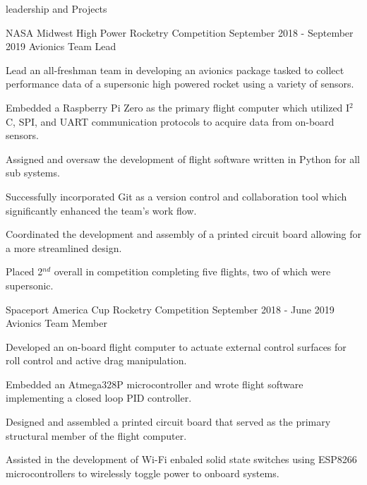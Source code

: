 \documentclass{resume} %
\begin{document}
\begin{rSection} {leadership and Projects}
\begin{rSubsection} {NASA Midwest High Power Rocketry Competition} {September 2018 - September 2019} {Avionics Team Lead}
            \item Lead an all-freshman team in developing an avionics package tasked to collect performance data of a supersonic high powered rocket using a variety of sensors.
            \item Embedded a Raspberry Pi Zero as the primary flight computer which utilized I$^2$C, SPI, and UART communication protocols to acquire data from on-board sensors.
            \item Assigned and oversaw the development of flight software written in Python for all sub systems.
            \item Successfully incorporated Git as a version control and collaboration tool which significantly enhanced the team's work flow.
            \item Coordinated the development and assembly of a printed circuit board allowing for a more streamlined design.
            \item Placed 2$^{nd}$ overall in competition completing five flights, two of which were supersonic.

        \end{rSubsection}

        \smallskip


        \begin{rSubsection} {Spaceport America Cup Rocketry Competition} {September 2018 - June 2019} {Avionics Team Member}

            \item Developed an on-board flight computer to actuate external control surfaces for roll control and active drag manipulation.
            \item Embedded an Atmega328P microcontroller and wrote flight software implementing a closed loop PID controller.
            \item Designed and assembled a printed circuit board that served as the primary structural member of the flight computer.
            \item Assisted in the development of Wi-Fi enbaled solid state switches using ESP8266 microcontrollers to wirelessly toggle power to onboard systems.

        \end{rSubsection}

    \end{rSection}
\end{document}
